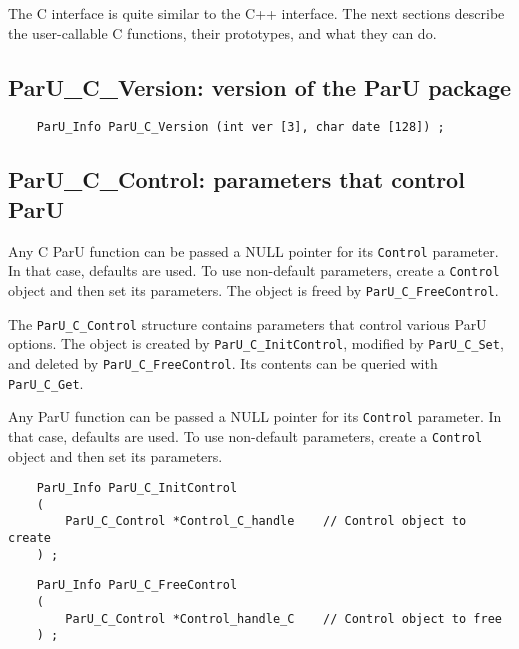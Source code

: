 \documentclass[12pt]{article}
\begin{document}
The C interface is quite similar to the C++ interface.  The next sections
describe the user-callable C functions, their prototypes, and what they can do.

\subsection{{\sf ParU\_C\_Version}: version of the ParU package}

    {\footnotesize
    \begin{verbatim}
    ParU_Info ParU_C_Version (int ver [3], char date [128]) ; \end{verbatim} }

\subsection{{\sf ParU\_C\_Control}: parameters that control ParU}

    Any C ParU function can be passed a NULL pointer for its \verb'Control'
    parameter.  In that case, defaults are used.  To use non-default
    parameters, create a \verb'Control' object and then set its parameters.
    The object is freed by \verb'ParU_C_FreeControl'.

    The \verb'ParU_C_Control' structure contains parameters that control
    various ParU options.  The object is created by \verb'ParU_C_InitControl',
    modified by \verb'ParU_C_Set', and deleted by \verb'ParU_C_FreeControl'.
    Its contents can be queried with \verb'ParU_C_Get'.

    Any ParU function can be passed a NULL pointer for its \verb'Control'
    parameter.  In that case, defaults are used.  To use non-default
    parameters, create a \verb'Control' object and then set its parameters.

    {\footnotesize
    \begin{verbatim}
    ParU_Info ParU_C_InitControl
    (
        ParU_C_Control *Control_C_handle    // Control object to create
    ) ; \end{verbatim} }

    {\footnotesize
    \begin{verbatim}
    ParU_Info ParU_C_FreeControl
    (
        ParU_C_Control *Control_handle_C    // Control object to free
    ) ; \end{verbatim} }
\end{document}
